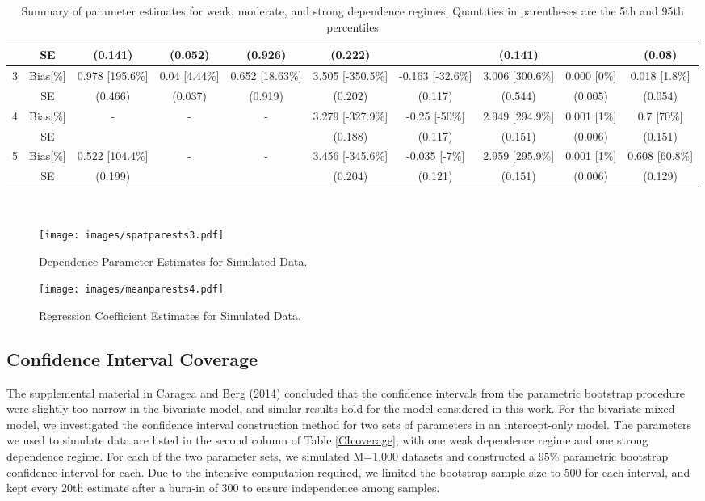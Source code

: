 \documentclass[12pt, a4paper, twoside]{article}
\begin{document}
\begin{sidewaystable}
\begin{table}[H]
{\begin{tabular}{|c||c||c||c||c||c||c||c||c||c|}
				& SE& (0.141) & (0.052) & (0.926) & (0.222) &  & (0.141) & & (0.08) \\
				\hline
				3 &Bias[\%]& 0.978 [195.6\%] & 0.04 [4.44\%] & 0.652 [18.63\%] & 3.505 [-350.5\%] & -0.163 [-32.6\%] & 3.006 [300.6\%] & 0.000 [0\%] & 0.018 [1.8\%] \\ 
				&SE& (0.466) & (0.037) & (0.919) & (0.202) & (0.117) & (0.544) & (0.005) & (0.054) \\ \hline
				4 &Bias[\%] & -& - & -& 3.279 [-327.9\%] & -0.25 [-50\%] & 2.949 [294.9\%] & 0.001 [1\%] & 0.7 [70\%] \\  
				&SE &  &  &  & (0.188) & (0.117) & (0.151) & (0.006) & (0.151) \\  \hline
				5 &Bias[\%] & 0.522 [104.4\%] & - & - & 3.456 [-345.6\%] & -0.035 [-7\%] & 2.959 [295.9\%] & 0.001 [1\%] & 0.608 [60.8\%] \\
				&SE & (0.199) &  & & (0.204) & (0.121) & (0.151) & (0.006) & (0.129) \\ 
				\hline
		\end{tabular}}\\
		\caption[Summary of MPLE estimates for simulated data]{Summary of parameter estimates for weak, moderate, and strong dependence regimes. Quantities in parentheses are the 5th and 95th percentiles}
		\label{EstResults}
	\end{table}
\end{sidewaystable}
\begin{figure}[H]
\centering
\texttt{[image: images/spatparests3.pdf]}
\caption{Dependence Parameter Estimates for Simulated Data.}
\label{spatests}
\vspace{.5cm}
\centering
\texttt{[image: images/meanparests4.pdf]}
\caption{Regression Coefficient Estimates for Simulated Data.}
\label{meanests}
\end{figure}

\subsection{Confidence Interval Coverage}\label{CISIM}
The supplemental material in Caragea and Berg (2014) concluded that the confidence intervals from the parametric bootstrap procedure were slightly too narrow in the bivariate model, and similar results hold for the model considered in this work. For the bivariate mixed model, we investigated the confidence interval construction method for two sets of parameters in an intercept-only model. The parameters we used to simulate data are listed in the second column of Table \ref{CIcoverage}, with one weak dependence regime and one strong dependence regime. For each of the two parameter sets,  we simulated M=1,000 datasets and constructed a 95\% parametric bootstrap confidence interval for each. Due to the intensive computation required, we limited the bootstrap sample size to 500 for each interval, and kept every 20th estimate after a burn-in of 300 to ensure independence among samples.
\end{document}
